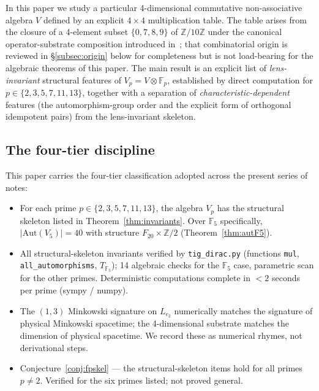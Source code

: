\documentclass[11pt,reqno]{amsart}
\theoremstyle{plain}
\theoremstyle{definition}
\theoremstyle{remark}
\newcommand{\Z}{\mathbb{Z}}
\newcommand{\F}{\mathbb{F}}
\newcommand{\Aut}{\mathrm{Aut}}
\begin{document}
In this paper we study a particular 4-dimensional commutative
non-associative algebra $V$ defined by an explicit $4 \times 4$
multiplication table. The table arises from the closure of a 4-element
subset $\{0, 7, 8, 9\}$ of $\Z/10\Z$ under the canonical
operator-substrate composition introduced
in~\cite{SandersGishFourCore}; that combinatorial origin is reviewed in
§\ref{subsec:origin} below for completeness but is not load-bearing for
the algebraic theorems of this paper. The main result is an explicit
list of \emph{lens-invariant} structural features of $V_p = V \otimes \F_p$,
established by direct computation for $p \in \{2, 3, 5, 7, 11, 13\}$,
together with a separation of \emph{characteristic-dependent} features
(the automorphism-group order and the explicit form of orthogonal
idempotent pairs) from the lens-invariant skeleton.

\subsection{The four-tier discipline}
\label{subsec:tiers}

This paper carries the four-tier classification adopted across the
present series of notes:
\begin{itemize}[leftmargin=2.5em]
\item[\textbf{PROVEN.}] For each prime $p \in \{2, 3, 5, 7, 11, 13\}$,
the algebra $V_p$ has the structural skeleton listed in
Theorem~\ref{thm:invariants}. Over $\F_5$ specifically,
$|\Aut(V_5)| = 40$ with structure $F_{20} \times \Z/2$
(Theorem~\ref{thm:autF5}).
\item[\textbf{COMPUTED.}] All structural-skeleton invariants verified
by \texttt{tig\_dirac.py} (functions \texttt{mul},
\texttt{all\_automorphisms}, $T_{\F_5}$); 14 algebraic checks for the
$\F_5$ case, parametric scan for the other primes. Deterministic
computations complete in $<2$ seconds per prime (sympy / numpy).
\item[\textbf{STRUCTURAL RHYME.}] The $(1, 3)$ Minkowski signature on
$L_{e_2}$ numerically matches the signature of physical Minkowski
spacetime; the 4-dimensional substrate matches the dimension of physical
spacetime. We record these as numerical rhymes, not derivational steps.
\item[\textbf{OPEN.}] Conjecture~\ref{conj:fpskel} — the
structural-skeleton items hold for all primes $p \neq 2$. Verified for
the six primes listed; not proved general.
\end{itemize}
\end{document}
